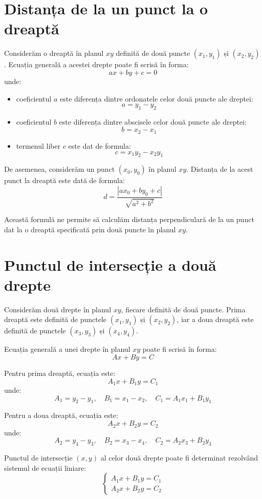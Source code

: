 \documentclass[a4paper,12pt]{report}
\begin{document}
\section{Distanța de la un punct la o dreaptă}
Considerăm o dreaptă în planul $xy$ definită de două puncte $(x_1, y_1)$ și $(x_2, y_2)$. Ecuația generală a acestei drepte poate fi scrisă în forma:
\[
    ax + by + c = 0
\]
unde:
\begin{itemize}
    \item coeficientul $a$ este diferența dintre ordonatele celor două puncte ale dreptei:
          \[
              a = y_1 - y_2
          \]
    \item coeficientul $b$ este diferența dintre abscisele celor două puncte ale dreptei:
          \[
              b = x_2 - x_1
          \]
    \item termenul liber $c$ este dat de formula:
          \[
              c = x_1 y_2 - x_2 y_1
          \]
\end{itemize}

De asemenea, considerăm un punct $(x_0, y_0)$ în planul $xy$. Distanța de la acest punct la dreaptă este dată de formula:
\[
    d = \frac{|a x_0 + b y_0 + c|}{\sqrt{a^2 + b^2}}
\]

Această formulă ne permite să calculăm distanța perpendiculară de la un punct dat la o dreaptă specificată prin două puncte în planul $xy$.

\section{Punctul de intersecție a două drepte}
Considerăm două drepte în planul $xy$, fiecare definită de două puncte. Prima dreaptă este definită de punctele $(x_1, y_1)$ și $(x_2, y_2)$, iar a doua dreaptă este definită de punctele $(x_3, y_3)$ și $(x_4, y_4)$.

Ecuația generală a unei drepte în planul $xy$ poate fi scrisă în forma:
\[
    Ax + By = C
\]

Pentru prima dreaptă, ecuația este:
\[
    A_1 x + B_1 y = C_1
\]
unde:
\[
    A_1 = y_2 - y_1, \quad B_1 = x_1 - x_2, \quad C_1 = A_1 x_1 + B_1 y_1
\]

Pentru a doua dreaptă, ecuația este:
\[
    A_2 x + B_2 y = C_2
\]
unde:
\[
    A_2 = y_4 - y_3, \quad B_2 = x_3 - x_4, \quad C_2 = A_2 x_3 + B_2 y_3
\]

Punctul de intersecție $(x, y)$ al celor două drepte poate fi determinat rezolvând sistemul de ecuații liniare:
\[
    \begin{cases}
        A_1 x + B_1 y = C_1 \\
        A_2 x + B_2 y = C_2
    \end{cases}
\]
\end{document}
